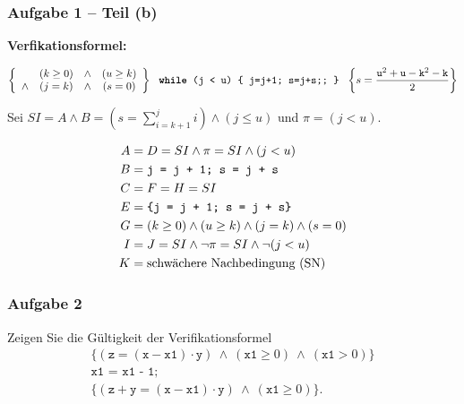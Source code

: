 \documentclass{beamer}
\renewcommand{\emph}[1]{\textbf{#1}}
\newcommand{\logand}{ \ \land \ }
\begin{document}
\begin{frame} \frametitle{Aufgabe 1 -- Teil (b)}
	\small
	
	\begin{center}
		\emph{Verfikationsformel:} 
		\begin{scriptsize}
			\setlength\arraycolsep{1pt}
			\begin{equation*}
				\left\{ \begin{array}{cccc}
						& (k \ge 0) &\land& (u \ge k) \\
						\land & (j = k)   &\land& (s = 0)
					\end{array}
					\right\} \ \ \texttt{\emph{while} (\texttt{j} < \texttt{u}) \{ \texttt{j=j+1; s=j+s;}; \}} \ \ \left\{
					s = \frac{\texttt{u}^2 + \texttt{u} - \texttt{k}^2 - \texttt{k}}{2}
					\right\}
			\end{equation*}
		\end{scriptsize}
	\end{center}
	
	\bigskip
	
	Sei $SI = A \land B = \left( s = \sum\limits_{i = k+1}^j i \right) \land (j \le u)$ und $\pi = (j < u)$.
	
	
	\begin{align*}
		A &= D = SI \land \pi = SI \land (j < u) \\
		B &= \texttt{j = j + 1; s = j + s} \\
		C &= F = H = SI \\
		E &= \texttt{\{\texttt{j = j + 1; s = j + s}\}} \\
		G &= (k \ge 0) \land (u \ge k) \land (j = k) \land (s = 0) \\
		I &= J = SI \land \lnot \pi = SI \land \lnot (j < u) \\
		K &= \text{schwächere Nachbedingung (SN)}
	\end{align*}
\end{frame}

\begin{frame}[t] \frametitle{Aufgabe 2}
	\footnotesize
	Zeigen Sie die Gültigkeit der Verifikationsformel
	\begin{equation*}
		\begin{gathered}
			\Big\{ (\texttt{z} = (\texttt{x} - \texttt{x1}) \cdot \texttt{y}) \logand (\texttt{x1} \ge 0) \logand (\texttt{x1} > 0) \Big\} \\
			\texttt{x1 = x1 - 1;} \\
			\Big\{ (\texttt{z} + \texttt{y} = (\texttt{x} - \texttt{x1}) \cdot \texttt{y}) \logand (\texttt{x1} \ge 0) \Big\}.
		\end{gathered}
	\end{equation*}
\end{frame}
\end{document}
